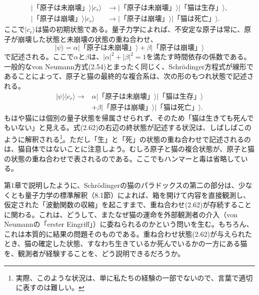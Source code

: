 \hypertarget{srcpage:58}{}\label{srcpage:58}
\begin{align}
\lvert\text{「原子は未崩壊」}\rangle\lvert c_r\rangle&\longrightarrow\lvert\text{「原子は未崩壊」}\rangle\lvert\text{「猫は生存」}\rangle,\tag{2.60a}\\
\lvert\text{「原子は崩壊」}\rangle\lvert c_r\rangle&\longrightarrow\lvert\text{「原子は崩壊」}\rangle\lvert\text{「猫は死亡」}\rangle.\tag{2.60b}
\end{align}
ここで$\lvert c_r\rangle$は猫の初期状態である。量子力学によれば、不安定な原子は常に、原子が崩壊した状態と未崩壊の状態の重ね合わせ、
\begin{equation}\lvert\psi\rangle=\alpha\lvert\text{「原子は未崩壊」}\rangle+\beta\lvert\text{「原子は崩壊」}\rangle\tag{2.61}\end{equation}
で記述される。ここで$\alpha$と$\beta$は、$\lvert\alpha\rvert^2+\lvert\beta\rvert^2=1$を満たす時間依存の係数である。一般的なvon Neumann方式(2.54)とまったく同じく、Schrödinger方程式が線形であることによって、原子と猫の最終的な複合系は、次の形のもつれ状態で記述される。
\begin{equation}\begin{split}\lvert\psi\rangle\lvert c_r\rangle\longrightarrow{}&\alpha\lvert\text{「原子は未崩壊」}\rangle\lvert\text{「猫は生存」}\rangle\\&+\beta\lvert\text{「原子は崩壊」}\rangle\lvert\text{「猫は死亡」}\rangle.\end{split}\tag{2.62}\end{equation}
もはや猫には個別の量子状態を帰属させられず、そのため「猫は生きても死んでもいない」と見える。式(2.62)の右辺の終状態が記述する状況は、しばしばこのように解釈される\footnote{実際、このような状況は、単に私たちの経験の一部でないので、言葉で適切に表すのは難しい。}。ただし「生」と「死」の状態の重ね合わせで記述されるのは、猫自体ではないことに注意しよう。むしろ原子と猫の複合状態が、原子と猫の状態の重ね合わせで表されるのである。ここでもハンマーと毒は省略している。

第1章で説明したように、Schrödingerの猫のパラドックスの第二の部分は、少なくとも量子力学の標準解釈（8.1節）によれば、箱を開けて内容を直接観測し、仮定された「波動関数の収縮」を起こすまで、重ね合わせ(2.62)が存続することに関わる。これは、どうして、またなぜ猫の運命を外部観測者の介入（von Neumannの「erster Eingriff」）に委ねられるのかという問いを生む。もちろん、これは本質的に結果の問題そのものである。重ね合わせ状態(2.62)が与えられたとき、猫の確定した状態、すなわち生きているか死んでいるかの一方にある猫を、観測者が経験することを、どう説明できるだろうか。

